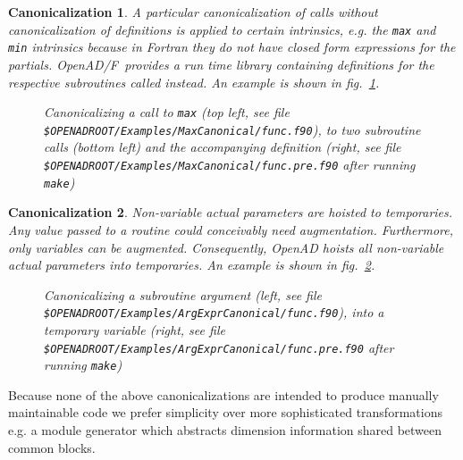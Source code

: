\documentclass{book}
\newcommand{\OpenADF}{OpenAD/F}
\newcommand{\OpenAD}{OpenAD}
\newcommand{\reffig}[1]{{fig.~\ref{#1}}}
\newtheorem{Can}{Canonicalization}
\begin{document}
\begin{Can}\label{can:intrin}
  A particular canonicalization of calls without canonicalization of definitions  
  is applied to certain intrinsics, e.g. the \lstinline{max} and \lstinline{min} intrinsics because in Fortran 
  they do not have closed form expressions for the partials. \OpenADF\ provides a run time 
  library containing definitions for the respective subroutines called instead.
  An example is shown in \reffig{fig:maxToSub}.  
\begin{figure}
\begin{minipage}[t]{.48\linewidth}


\end{minipage}
\hspace{.02\linewidth}
\begin{minipage}[t]{.48\linewidth}

\end{minipage}
\caption{Canonicalizing a call to {\tt max} (top left,  see file 
\lstinline{$OPENADROOT/Examples/MaxCanonical/func.f90}), %
to two subroutine calls (bottom left) and the accompanying definition (right,  see file 
\lstinline{$OPENADROOT/Examples/MaxCanonical/func.pre.f90} after running \lstinline{make})} %
 \label{fig:maxToSub}
  \end{figure}
\end{Can}
\begin{Can}\label{can:param}
  Non-variable actual parameters are hoisted to temporaries.
  Any value passed to a routine could conceivably need augmentation. Furthermore, only variables
  can be augmented. 
  Consequently, {\OpenAD} hoists all non-variable actual parameters into temporaries.
  An example is shown in \reffig{fig:ArgExprToTemp}.
\begin{figure}
\begin{minipage}[t]{.48\linewidth}

\end{minipage}
\hspace{.02\linewidth}
\begin{minipage}[t]{.48\linewidth}

\end{minipage}
\caption{Canonicalizing a subroutine argument (left, see file 
\lstinline{$OPENADROOT/Examples/ArgExprCanonical/func.f90}), %
into a temporary variable (right,  see file 
\lstinline{$OPENADROOT/Examples/ArgExprCanonical/func.pre.f90} after running \lstinline{make}) %
} \label{fig:ArgExprToTemp}
  \end{figure}
\end{Can}
Because none of the above canonicalizations are intended to produce manually 
maintainable code we prefer simplicity over more sophisticated transformations 
e.g. a module generator which abstracts dimension information shared between common blocks. 
\end{document}
